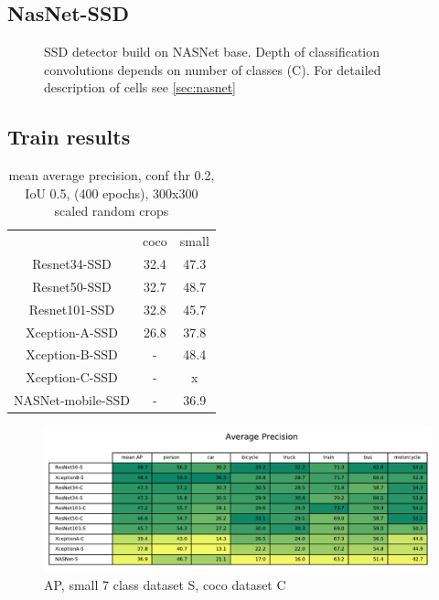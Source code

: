 \subsection{NasNet-SSD}

\begin{figure}
    \nasnetSSD
    \caption{SSD detector build on NASNet base. Depth of classification convolutions depends on number of classes (C). For detailed description of cells see \cref{sec:nasnet}}
    \label{fig:nasnetSSD}
\end{figure}


\subsection{Train results}
\begin{table}
    \begin{tabular}{c|c|c}
                            & coco      & small \\
        Resnet34-SSD        & 32.4      & 47.3  \\
        Resnet50-SSD        & 32.7      & 48.7  \\
        Resnet101-SSD       & 32.8      & 45.7  \\
        Xception-A-SSD      & 26.8      & 37.8  \\
        Xception-B-SSD      & -         & 48.4  \\
        Xception-C-SSD      & -         & x     \\
        NASNet-mobile-SSD   & -         & 36.9  \\
    \end{tabular}
    \caption{mean average precision, conf thr 0.2, IoU 0.5,  (400 epochs), 300x300 scaled random crops}
    \label{tab:map}
\end{table}

\begin{figure}
    \centering
    \includegraphics[width=\textwidth]{img/ap}
    \caption{AP, small 7 class dataset S, coco dataset C}
    \label{fig:ap}
\end{figure}


